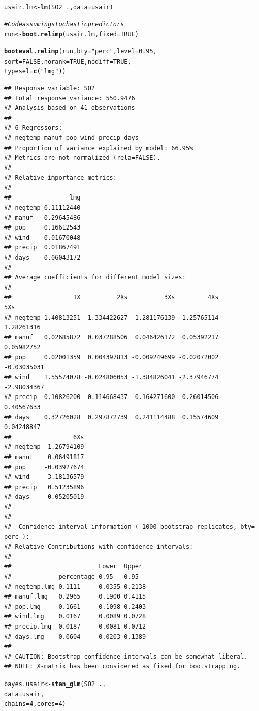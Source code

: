\documentclass[11pt,a4paper,twoside]{book}\usepackage[]{graphicx}\usepackage[]{color}
\makeatletter
\newcommand{\hlnum}[1]{\textcolor[rgb]{0.686,0.059,0.569}{#1}}%
\newcommand{\hlstr}[1]{\textcolor[rgb]{0.192,0.494,0.8}{#1}}%
\newcommand{\hlcom}[1]{\textcolor[rgb]{0.678,0.584,0.686}{\textit{#1}}}%
\newcommand{\hlopt}[1]{\textcolor[rgb]{0,0,0}{#1}}%
\newcommand{\hlstd}[1]{\textcolor[rgb]{0.345,0.345,0.345}{#1}}%
\newcommand{\hlkwb}[1]{\textcolor[rgb]{0.69,0.353,0.396}{#1}}%
\newcommand{\hlkwc}[1]{\textcolor[rgb]{0.333,0.667,0.333}{#1}}%
\newcommand{\hlkwd}[1]{\textcolor[rgb]{0.737,0.353,0.396}{\textbf{#1}}}%
\newenvironment{kframe}{%
 \def\at@end@of@kframe{}%
 \ifinner\ifhmode%
  \def\at@end@of@kframe{\end{minipage}}%
  \begin{minipage}{\columnwidth}%
 \fi\fi%
 \def\FrameCommand##1{\hskip\@totalleftmargin \hskip-\fboxsep
 \colorbox{shadecolor}{##1}\hskip-\fboxsep
     \hskip-\linewidth \hskip-\@totalleftmargin \hskip\columnwidth}%
 \MakeFramed {\advance\hsize-\width
   \@totalleftmargin\z@ \linewidth\hsize
   \@setminipage}}%
 {\par\unskip\endMakeFramed%
 \at@end@of@kframe}
\newenvironment{knitrout}{}{} %
\makeatother
\begin{document}
\begin{knitrout}
\color{fgcolor}\begin{kframe}
\begin{alltt}
\hlstd{usair.lm} \hlkwb{<-} \hlkwd{lm}\hlstd{(SO2}\hlopt{~}\hlstd{.,} \hlkwc{data} \hlstd{= usair)}


\hlcom{#Code assuming stochastic predictors}
\hlstd{run}\hlkwb{<-}\hlkwd{boot.relimp}\hlstd{(usair.lm,} \hlkwc{fixed}\hlstd{=}\hlnum{TRUE}\hlstd{)}

\hlkwd{booteval.relimp}\hlstd{(run,} \hlkwc{bty} \hlstd{=} \hlstr{"perc"}\hlstd{,} \hlkwc{level} \hlstd{=} \hlnum{0.95}\hlstd{,}
                \hlkwc{sort} \hlstd{=} \hlnum{FALSE}\hlstd{,} \hlkwc{norank} \hlstd{=} \hlnum{TRUE}\hlstd{,} \hlkwc{nodiff} \hlstd{=} \hlnum{TRUE}\hlstd{,}
                \hlkwc{typesel} \hlstd{=} \hlkwd{c}\hlstd{(}\hlstr{"lmg"}\hlstd{))}
\end{alltt}
\begin{verbatim}
## Response variable: SO2 
## Total response variance: 550.9476 
## Analysis based on 41 observations 
## 
## 6 Regressors: 
## negtemp manuf pop wind precip days 
## Proportion of variance explained by model: 66.95%
## Metrics are not normalized (rela=FALSE). 
## 
## Relative importance metrics: 
## 
##                lmg
## negtemp 0.11112440
## manuf   0.29645486
## pop     0.16612543
## wind    0.01670048
## precip  0.01867491
## days    0.06043172
## 
## Average coefficients for different model sizes: 
## 
##                 1X          2Xs          3Xs         4Xs         5Xs
## negtemp 1.40813251  1.334422627  1.281176139  1.25765114  1.28261316
## manuf   0.02685872  0.037288506  0.046426172  0.05392217  0.05982752
## pop     0.02001359  0.004397813 -0.009249699 -0.02072002 -0.03035031
## wind    1.55574078 -0.024806053 -1.384826041 -2.37946774 -2.98034367
## precip  0.10826200  0.114668437  0.164271600  0.26014506  0.40567633
## days    0.32726028  0.297872739  0.241114488  0.15574609  0.04248847
##                 6Xs
## negtemp  1.26794109
## manuf    0.06491817
## pop     -0.03927674
## wind    -3.18136579
## precip   0.51235896
## days    -0.05205019
## 
##  
##  Confidence interval information ( 1000 bootstrap replicates, bty= perc ): 
## Relative Contributions with confidence intervals: 
##  
##                        Lower  Upper
##             percentage 0.95   0.95  
## negtemp.lmg 0.1111     0.0355 0.2138
## manuf.lmg   0.2965     0.1900 0.4115
## pop.lmg     0.1661     0.1098 0.2403
## wind.lmg    0.0167     0.0089 0.0728
## precip.lmg  0.0187     0.0081 0.0712
## days.lmg    0.0604     0.0203 0.1389
## 
## CAUTION: Bootstrap confidence intervals can be somewhat liberal. 
## NOTE: X-matrix has been considered as fixed for bootstrapping.
\end{verbatim}
\begin{alltt}
\hlstd{bayes.usair} \hlkwb{<-} \hlkwd{stan_glm}\hlstd{(SO2} \hlopt{~} \hlstd{. ,}
                  \hlkwc{data} \hlstd{= usair,}
                  \hlkwc{chains} \hlstd{=} \hlnum{4}\hlstd{,} \hlkwc{cores} \hlstd{=} \hlnum{4}\hlstd{)}


\end{alltt}
\end{kframe}
\end{knitrout}
\end{document}
